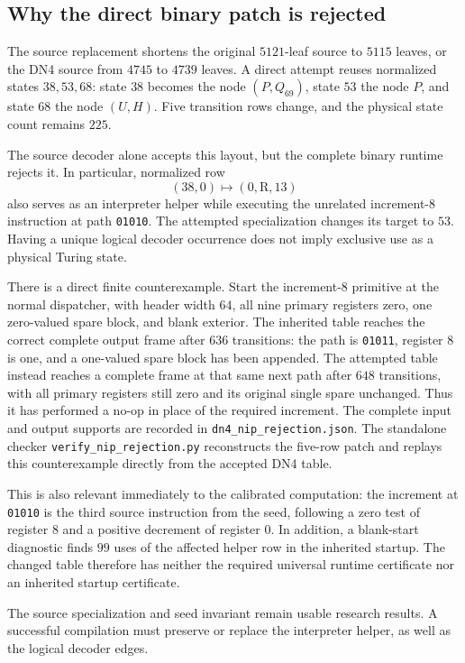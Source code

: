 \subsection{Why the direct binary patch is rejected}

The source replacement shortens the original $5121$-leaf source to
$5115$ leaves, or the DN4 source from $4745$ to $4739$ leaves.
A direct attempt reuses normalized states $38,53,68$:
state $38$ becomes the node $(P,Q_{69})$, state $53$ the node $P$,
and state $68$ the node $(U,H)$.  Five transition rows change, and the
physical state count remains $225$.

The source decoder alone accepts this layout, but the complete binary
runtime rejects it.  In particular, normalized row
\[
 (38,0)\longmapsto(0,\mathrm R,13)
\]
also serves as an interpreter helper while executing the unrelated
increment-$8$ instruction at path \texttt{01010}.  The attempted
specialization changes its target to $53$.  Having a unique logical
decoder occurrence does not imply exclusive use as a physical Turing
state.

There is a direct finite counterexample.  Start the increment-$8$
primitive at the normal dispatcher, with header width $64$, all nine
primary registers zero, one zero-valued spare block, and blank exterior.
The inherited table reaches the correct complete output frame after
$636$ transitions: the path is \texttt{01011}, register $8$ is one,
and a one-valued spare block has been appended.  The attempted table
instead reaches a complete frame at that same next path after $648$
transitions, with all primary registers still zero and its original
single spare unchanged.  Thus it has performed a no-op in place of
the required increment.  The complete input and output supports are
recorded in \texttt{dn4\_nip\_rejection.json}.  The standalone checker
\texttt{verify\_nip\_rejection.py} reconstructs the five-row patch and
replays this counterexample directly from the accepted DN4 table.

This is also relevant immediately to the calibrated computation:
the increment at \texttt{01010} is the third source instruction from
the seed, following a zero test of register $8$ and a positive decrement
of register $0$.  In addition, a blank-start diagnostic finds $99$
uses of the affected helper row in the inherited startup.  The changed
table therefore has neither the required universal runtime certificate
nor an inherited startup certificate.

The source specialization and seed invariant remain usable research
results.  A successful compilation must preserve or replace the
interpreter helper, as well as the logical decoder edges.

